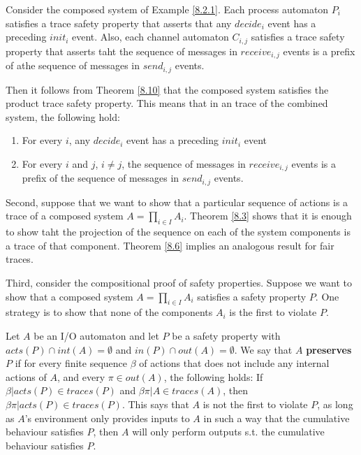 \documentclass[11pt]{article}
\begin{document}
\begin{examplle}
Consider the composed system of Example \ref{8.2.1}. Each process automaton \(P_i\) satisfies a trace
safety property that asserts that any \(decide_i\) event has a preceding \(init_i\) event. Also, each
channel automaton \(C_{i,j}\)  satisfies a trace safety property that asserts taht the sequence of
messages in \(receive_{i,j}\) events is a prefix of athe sequence of messages in \(send_{i,j}\)
events.

Then it follows from Theorem \ref{8.10} that the composed system satisfies the product trace safety
property. This means that in an trace of the combined system, the following hold:
\begin{enumerate}
\item For every \(i\), any \(decide_i\) event has a preceding \(init_i\) event
\item For every \(i\) and \(j\), \(i\neq j\), the sequence of messages in \(receive_{i,j}\) events is a
prefix of the sequence of messages in \(send_{i,j}\) events.
\end{enumerate}
\end{examplle}

Second, suppose that we want to show that a particular sequence of actions is a trace of a composed
system \(A=\prod_{i\in I}A_i\).  Theorem \ref{8.3} shows that it is enough to show taht the projection
of the sequence on each of the system components is a trace of that component. Theorem \ref{8.6} implies
an analogous result for fair traces.

Third, consider the compositional proof of safety properties. Suppose we want to show that a composed
system \(A=\prod_{i\in I}A_i\) satisfies a safety property \(P\). One strategy is to show that none of
the components \(A_i\) is the first to violate \(P\).

Let \(A\) be an I/O automaton and let \(P\) be a safety property with \(acts(P)\cap int(A)=\emptyset\)
and \(in(P)\cap out(A)=\emptyset\). We say that \(A\) \textbf{preserves} \(P\) if for every finite sequence
\(\beta\) of actions that does not include any internal actions of \(A\), and every \(\pi\in out(A)\),
the following holds: If \(\beta|acts(P)\in traces(P)\) and \(\beta\pi|A\in traces(A)\), then
\(\beta\pi|acts(P)\in traces(P)\). This says that \(A\) is not the first to violate \(P\), as long as
\(A\)'s environment only provides inputs to \(A\) in such a way that the cumulative behaviour
satisfies \(P\), then \(A\) will only perform outputs s.t. the cumulative behaviour satisfies \(P\).
\end{document}
